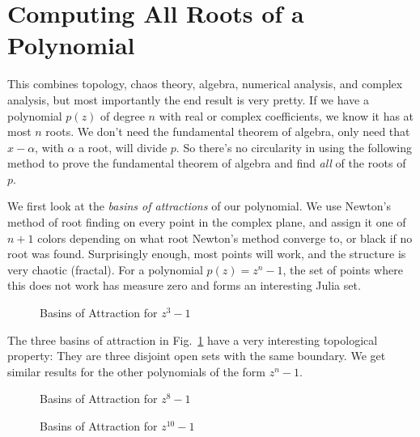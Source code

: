 \documentclass{article}
\begin{document}
    \section*{Computing All Roots of a Polynomial}
        This combines topology, chaos theory, algebra, numerical analysis, and complex analysis, but
        most importantly the end result is very pretty. If we have a polynomial $p(z)$ of degree $n$
        with real or complex coefficients, we know it has at most $n$ roots. We don't need the
        fundamental theorem of algebra, only need that $x-\alpha$, with $\alpha$ a root, will divide
        $p$. So there's no circularity in using the following method to prove the fundamental theorem
        of algebra and find \textit{all} of the roots of $p$.
        \par\hfill\par
        We first look at the \textit{basins of attractions} of our polynomial. We use Newton's method
        of root finding on every point in the complex plane, and assign it one of $n+1$ colors
        depending on what root Newton's method converge to, or black if no root was found.
        Surprisingly enough, most points will work, and the structure is very chaotic (fractal).
        For a polynomial $p(z)=z^{n}-1$, the set of points where this does not work has measure zero
        and forms an interesting Julia set.
        \begin{figure}[H]
            \centering
            \caption{Basins of Attraction for $z^{3}-1$}
            \label{fig:z3_minus_1}
        \end{figure}
        The three basins of attraction in Fig.~\ref{fig:z3_minus_1} have a very interesting
        topological property: They are three disjoint open sets with the same boundary.
        We get similar results for the other polynomials of the form $z^{n}-1$.
        \begin{figure}[H]
            \centering
            \caption{Basins of Attraction for $z^{8}-1$}
            \label{fig:z8_minus_1}
        \end{figure}
        \begin{figure}[H]
            \centering
            \caption{Basins of Attraction for $z^{10}-1$}
            \label{fig:z10_minus_1}
        \end{figure}
\end{document}
